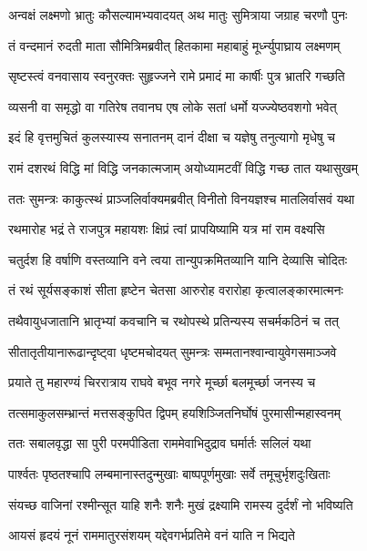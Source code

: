 \twolineshloka
{अन्वक्षं लक्ष्मणो भ्रातुः कौसल्यामभ्यवादयत्}
{अथ मातुः सुमित्राया जग्राह चरणौ पुनः} %

\twolineshloka
{तं वन्दमानं रुदती माता सौमित्रिमब्रवीत्}
{हितकामा महाबाहुं मूर्ध्न्युपाघ्राय लक्ष्मणम्} %

\twolineshloka
{सृष्टस्त्वं वनवासाय स्वनुरक्तः सुहृज्जने}
{रामे प्रमादं मा कार्षीः पुत्र भ्रातरि गच्छति} %

\twolineshloka
{व्यसनी वा समृद्धो वा गतिरेष तवानघ}
{एष लोके सतां धर्मो यज्ज्येष्ठवशगो भवेत्} %

\twolineshloka
{इदं हि वृत्तमुचितं कुलस्यास्य सनातनम्}
{दानं दीक्षा च यज्ञेषु तनुत्यागो मृधेषु च} %

\twolineshloka
{रामं दशरथं विद्धि मां विद्धि जनकात्मजाम्}
{अयोध्यामटवीं विद्धि गच्छ तात यथासुखम्} %

\twolineshloka
{ततः सुमन्त्रः काकुत्स्थं प्राञ्जलिर्वाक्यमब्रवीत्}
{विनीतो विनयज्ञश्च मातलिर्वासवं यथा} %

\twolineshloka
{रथमारोह भद्रं ते राजपुत्र महायशः}
{क्षिप्रं त्वां प्रापयिष्यामि यत्र मां राम वक्ष्यसि} %

\twolineshloka
{चतुर्दश हि वर्षाणि वस्तव्यानि वने त्वया}
{तान्युपक्रमितव्यानि यानि देव्यासि चोदितः} %

\twolineshloka
{तं रथं सूर्यसङ्काशं सीता हृष्टेन चेतसा}
{आरुरोह वरारोहा कृत्वालङ्कारमात्मनः} %

\twolineshloka
{तथैवायुधजातानि भ्रातृभ्यां कवचानि च}
{रथोपस्थे प्रतिन्यस्य सचर्मकठिनं च तत्} %

\twolineshloka
{सीतातृतीयानारूढान्दृष्ट्वा धृष्टमचोदयत्}
{सुमन्त्रः सम्मतानश्वान्वायुवेगसमाञ्जवे} %

\twolineshloka
{प्रयाते तु महारण्यं चिररात्राय राघवे}
{बभूव नगरे मूर्च्छा बलमूर्च्छा जनस्य च} %

\twolineshloka
{तत्समाकुलसम्भ्रान्तं मत्तसङ्कुपित द्विपम्}
{हयशिञ्जितनिर्घोषं पुरमासीन्महास्वनम्} %

\twolineshloka
{ततः सबालवृद्धा सा पुरी परमपीडिता}
{राममेवाभिदुद्राव घर्मार्तः सलिलं यथा} %

\twolineshloka
{पार्श्वतः पृष्ठतश्चापि लम्बमानास्तदुन्मुखाः}
{बाष्पपूर्णमुखाः सर्वे तमूचुर्भृशदुःखिताः} %

\twolineshloka
{संयच्छ वाजिनां रश्मीन्सूत याहि शनैः शनैः}
{मुखं द्रक्ष्यामि रामस्य दुर्दर्शं नो भविष्यति} %

\twolineshloka
{आयसं हृदयं नूनं राममातुरसंशयम्}
{यद्देवगर्भप्रतिमे वनं याति न भिद्यते} %

